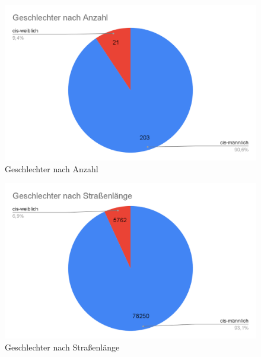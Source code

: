 \documentclass[ngerman,twocolumn,showpacs,%
  nofootinbib,aps,superscriptaddress,%
  eqsecnum,prd,notitlepage,showkeys,10pt,report]{revtex4-2}
\begin{document}
\begin{figure}
\centering
\includegraphics[width=1\linewidth]{3.png}
\caption{Geschlechter nach Anzahl}
\label{fig:GendersByCount}
\end{figure}
\begin{figure}
\centering
\includegraphics[width=1\linewidth]{4.png}
\caption{Geschlechter nach Straßenlänge}
\label{fig:GendersByLength}
\end{figure}
\end{document}
